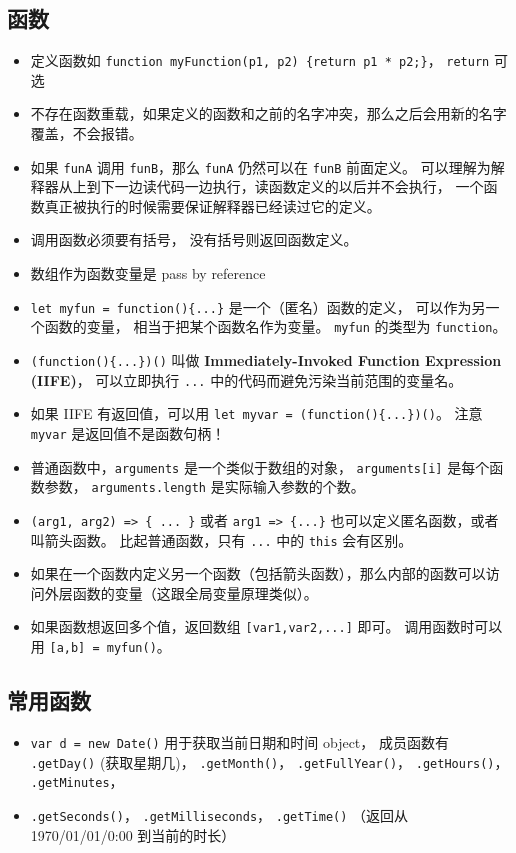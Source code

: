 \subsection{函数}
\begin{itemize}
\item 定义函数如 \verb|function myFunction(p1, p2) {return p1 * p2;}|， \verb|return| 可选
\item 不存在函数重载，如果定义的函数和之前的名字冲突，那么之后会用新的名字覆盖，不会报错。
\item 如果 \verb`funA` 调用 \verb`funB`，那么 \verb`funA` 仍然可以在 \verb`funB` 前面定义。 可以理解为解释器从上到下一边读代码一边执行，读函数定义的以后并不会执行， 一个函数真正被执行的时候需要保证解释器已经读过它的定义。
\item 调用函数必须要有括号， 没有括号则返回函数定义。
\item 数组作为函数变量是 pass by reference
\item \verb|let myfun = function(){...}| 是一个（匿名）函数的定义， 可以作为另一个函数的变量， 相当于把某个函数名作为变量。 \verb`myfun` 的类型为 \verb|function|。
\item \verb|(function(){...})()| 叫做 \textbf{Immediately-Invoked Function Expression (IIFE)}， 可以立即执行 \verb|...| 中的代码而避免污染当前范围的变量名。
\item 如果 IIFE 有返回值，可以用 \verb`let myvar = (function(){...})()`。 注意 \verb`myvar` 是返回值不是函数句柄！
\item 普通函数中，\verb`arguments` 是一个类似于数组的对象， \verb`arguments[i]` 是每个函数参数， \verb`arguments.length` 是实际输入参数的个数。
\item \verb`(arg1, arg2) => { ... }` 或者 \verb`arg1 => {...}` 也可以定义匿名函数，或者叫箭头函数。 比起普通函数，只有 \verb`...` 中的 \verb`this` 会有区别。
\item 如果在一个函数内定义另一个函数（包括箭头函数），那么内部的函数可以访问外层函数的变量（这跟全局变量原理类似）。
\item 如果函数想返回多个值，返回数组 \verb`[var1,var2,...]` 即可。 调用函数时可以用 \verb`[a,b] = myfun()`。
\end{itemize}

\subsection{常用函数}
\begin{itemize}
\item \verb|var d = new Date()| 用于获取当前日期和时间 object， 成员函数有 \verb|.getDay()| (获取星期几)， \verb|.getMonth()|， \verb|.getFullYear()|， \verb|.getHours()|， \verb|.getMinutes|，
\item \verb|.getSeconds()|， \verb|.getMilliseconds|， \verb|.getTime()| （返回从 1970/01/01/0:00 到当前的时长）
\end{itemize}

